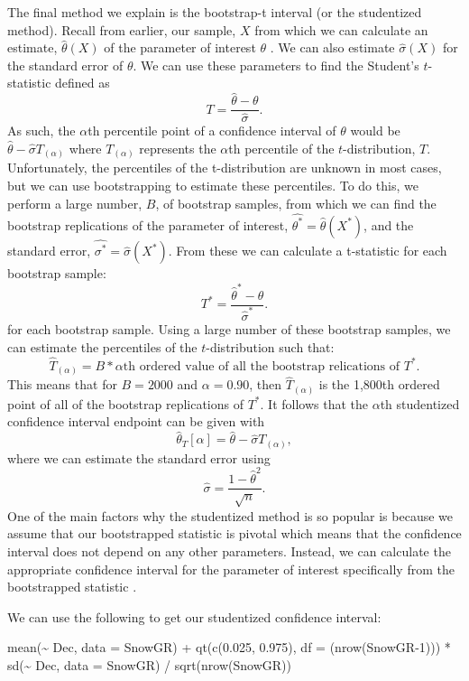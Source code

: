 \documentclass[12pt]{article}
\newenvironment{Shaded}{\begin{snugshade}}{\end{snugshade}}
\newcommand{\AttributeTok}[1]{\textcolor[rgb]{0.77,0.63,0.00}{#1}}
\newcommand{\DecValTok}[1]{\textcolor[rgb]{0.00,0.00,0.81}{#1}}
\newcommand{\FloatTok}[1]{\textcolor[rgb]{0.00,0.00,0.81}{#1}}
\newcommand{\FunctionTok}[1]{\textcolor[rgb]{0.00,0.00,0.00}{#1}}
\newcommand{\NormalTok}[1]{#1}
\newcommand{\SpecialCharTok}[1]{\textcolor[rgb]{0.00,0.00,0.00}{#1}}
\begin{document}
The final method we explain is the bootstrap-t interval (or the
studentized method). Recall from earlier, our sample, \(X\) from which
we can calculate an estimate, \(\hat{\theta}(X)\) of the parameter of
interest \(\theta\) \citep[\citet{Puth15}]{Efron86}. We can also
estimate \(\hat{\sigma}(X)\) for the standard error of \(\theta\). We
can use these parameters to find the Student's \(t\)-statistic defined
as \[T = \frac{\hat{\theta} - \theta}{\hat{\sigma}}.\] As such, the
\(\alpha\)th percentile point of a confidence interval of \(\theta\)
would be \(\hat{\theta} - \hat{\sigma}T_{(\alpha)}\) where
\(T_{(\alpha)}\) represents the \(\alpha\)th percentile of the
\(t\)-distribution, \(T\). Unfortunately, the percentiles of the
t-distribution are unknown in most cases, but we can use bootstrapping
to estimate these percentiles. To do this, we perform a large number,
\(B\), of bootstrap samples, from which we can find the bootstrap
replications of the parameter of interest,
\(\hat{\theta^*} = \hat{\theta}(X^*)\), and the standard error,
\(\hat{\sigma^*} = \hat{\sigma}(X^*)\). From these we can calculate a
t-statistic for each bootstrap sample:
\[T^* = \frac{\hat{\theta}^* - \hat{\theta}}{\hat{\sigma}^*}.\] for each
bootstrap sample. Using a large number of these bootstrap samples, we
can estimate the percentiles of the \(t\)-distribution such that:
\[\hat{T}_{(\alpha)} = B*\alpha\text{th ordered value of all the bootstrap relications of }T^*.\]
This means that for \(B = 2000\) and \(\alpha = 0.90\), then
\(\hat{T}_{(\alpha)}\) is the 1,800th ordered point of all of the
bootstrap replications of \(T^*\). It follows that the \(\alpha\)th
studentized confidence interval endpoint can be given with
\[\hat{\theta}_T[\alpha] = \hat{\theta} - \hat{\sigma}T_{(\alpha)},\]
where we can estimate the standard error using
\[\hat{\sigma} = \frac{1-\hat{\theta}^2}{\sqrt{n}}.\] One of the main
factors why the studentized method is so popular is because we assume
that our bootstrapped statistic is pivotal which means that the
confidence interval does not depend on any other parameters. Instead, we
can calculate the appropriate confidence interval for the parameter of
interest specifically from the bootstrapped statistic
\citep[\citet{Puth15}]{Efron86}.

We can use the following to get our studentized confidence interval:

\begin{Shaded}
\begin{Highlighting}[]
\FunctionTok{mean}\NormalTok{(}\SpecialCharTok{\textasciitilde{}}\NormalTok{ Dec, }\AttributeTok{data =}\NormalTok{ SnowGR) }\SpecialCharTok{+} \FunctionTok{qt}\NormalTok{(}\FunctionTok{c}\NormalTok{(}\FloatTok{0.025}\NormalTok{, }\FloatTok{0.975}\NormalTok{), }\AttributeTok{df =}\NormalTok{ (}\FunctionTok{nrow}\NormalTok{(SnowGR}\DecValTok{{-}1}\NormalTok{))) }\SpecialCharTok{*} 
  \FunctionTok{sd}\NormalTok{(}\SpecialCharTok{\textasciitilde{}}\NormalTok{ Dec, }\AttributeTok{data =}\NormalTok{ SnowGR) }\SpecialCharTok{/} \FunctionTok{sqrt}\NormalTok{(}\FunctionTok{nrow}\NormalTok{(SnowGR))}
\end{Highlighting}
\end{Shaded}
\end{document}
